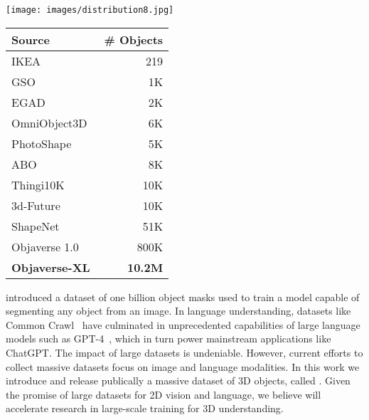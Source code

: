 \begin{minipage}{\textwidth}
  \begin{minipage}[b]{0.7\textwidth}
    \centering
    \texttt{[image: images/distribution8.jpg]}
    \label{fig:related}
  \end{minipage}
  \hfill
  \begin{minipage}[b]{0.275\textwidth}
    \centering
    \begin{adjustbox}{width=0.975\textwidth,center}
        \begin{tabular}{lr}
            \toprule
            Source & \# Objects\\
            \midrule
            IKEA~\cite{lim2013parsing} & 219\\
            GSO~\cite{downs2022google} & 1K\\
            EGAD~\cite{morrison2020egad} & 2K\\
            OmniObject3D~\cite{wu2023omniobject3d} & 6K\\
            PhotoShape~\cite{park2018photoshape} & 5K\\
            ABO~\cite{collins2022abo} & 8K\\
            Thingi10K~\cite{zhou2016thingi10k} & 10K\\
            3d-Future~\cite{fu20213d} & 10K\\
            ShapeNet~\cite{chang2015shapenet} & 51K\\\midrule
            Objaverse 1.0~\cite{deitke2022objaverse} & 800K\\[0.025in]
            \textbf{Objaverse-XL} & \textbf{10.2M}\\
            \bottomrule
        \end{tabular}
    \end{adjustbox}
    \vspace{1mm}
      \label{tab:related}
    \end{minipage}
\end{minipage}\vspace*{5mm}

introduced a dataset of one billion object masks used to train a model capable of segmenting any object from an image. 
In language understanding, datasets like Common Crawl~\cite{commoncrawl} have culminated in unprecedented capabilities of large language models such as GPT-4~\cite{openai2023gpt}, which in turn power mainstream applications like ChatGPT.
The impact of large datasets is undeniable. 
However, current efforts to collect massive datasets focus on image and language modalities. 
In this work we introduce and release publically a massive dataset of 3D objects, called \dataset. 
Given the promise of large datasets for 2D vision and language, we believe \dataset will accelerate research in large-scale training for 3D understanding.

